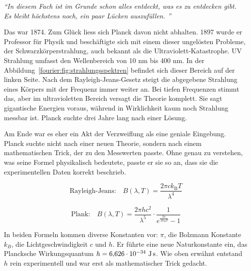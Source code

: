 	\begin{center}
		\textit{``{}In diesem Fach ist im Grunde schon alles entdeckt, was es zu entdecken gibt.\\
			Es bleibt höchstens noch, ein paar Lücken auszufüllen. ''}
	\end{center}
	
	Das war 1874.
	Zum Glück liess sich Planck davon nicht abhalten.
	1897 wurde er Professor für Physik und beschäftigte sich mit einem dieser ungelösten Probleme, der Schwarzkörperstrahlung, auch bekannt als die Ultraviolett-Katastrophe. 
	UV Strahlung umfasst den Wellenbereich von 10 nm bis 400 nm. 
	In der Abbildung~\ref{fourier:fig:strahlungsspektren} befindet sich dieser Bereich auf der linken Seite.
	Nach dem Rayleigh-Jeans-Gesetz steigt die abgegebene Strahlung eines Körpers mit der Frequenz immer weiter an. 
	Bei tiefen Frequenzen stimmt das, aber im ultravioletten Bereich versagt die Theorie komplett. 
	Sie sagt gigantische Energien voraus, während in Wirklichkeit kaum noch Strahlung messbar ist.
	Planck suchte drei Jahre lang nach einer Lösung. 
	
	
	Am Ende war es eher ein Akt der Verzweiflung als eine geniale Eingebung. 
	Planck suchte nicht nach einer neuen Theorie, sondern nach einem mathematischen Trick, der zu den Messwerten passte.
	Ohne genau zu verstehen, was seine Formel physikalisch bedeutete, passte er sie so an, dass sie die experimentellen Daten korrekt beschrieb.


	\begin{equation}
		\text{Rayleigh-Jeans:} \quad B(\lambda, T) = \frac{2 \pi c k_\mathrm{B} T}{\lambda^4}
	\end{equation}

	\begin{equation}
		\text{Plank:} \quad B(\lambda, T) = \frac{2 \pi h c^2}{\lambda^5} \cdot \frac{1}{e^{\frac{h c}{\lambda k_B T}} - 1}
	\end{equation}
	



	In beiden Formeln kommen diverse Konstanten vor: $\pi$, die Bolzmann Konstante $k_B$, die Lichtgeschwindigkeit $c$ und $h$. 
	Er führte eine neue Naturkonstante ein, das Plancksche Wirkungsquantum $h = 6{,}626 \cdot 10^{-34} \ \text{J\,s}$. 
	Wie oben erwähnt entstand $h$ rein experimentell und war erst als mathematischer Trick gedacht. 
	
